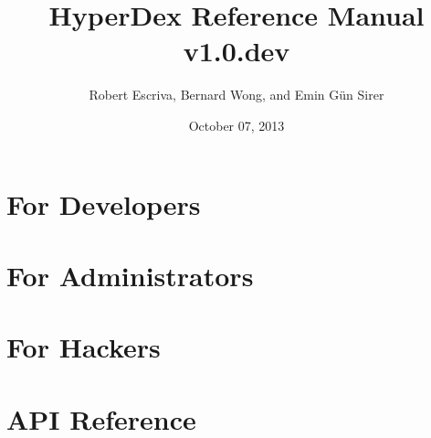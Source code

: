\documentclass[10pt,oneside]{book}
\title{HyperDex Reference Manual v1.0.dev}
\date{October 07, 2013}
\author{Robert Escriva, Bernard Wong, and Emin G{\"u}n Sirer}
\newcommand*{\topdir}{.}%
\newcommand*{\topdir}{..}%
\begin{document}
\frontmatter
\maketitle
\tableofcontents

\mainmatter




\part{For Developers}
\label{part:for-developers}






\part{For Administrators}
\label{part:for-admins}



\part{For Hackers}
\label{part:for-hackers}


\part{API Reference}
\label{part:api-ref}


\backmatter

\clearpage
{}
\printindex

\clearpage
{}


\end{document}
